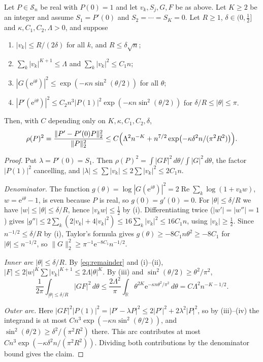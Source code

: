 \documentclass[11pt]{article}
\theoremstyle{remark}\newtheorem{remark}[theorem]{Remark}
\newcommand{\norm}[1]{\lVert #1\rVert}
\newcommand{\Rea}{\operatorname{Re}}
\newcommand{\ee}{\mathrm e}
\begin{document}
\begin{lemmaS}\label{lem:assemble}
Let \(P\in\mathcal S_n\) be real with \(P(0)=1\) and let \(v_k,S_j,G,F\)
be as above. Let \(K\ge2\) be an integer and assume
\(S_1=P'(0)\) and \(S_2=\cdots=S_K=0\). Let \(R\ge1\),
\(\delta\in(0,\frac12]\) and \(\kappa,C_1,C_2,\Lambda>0\), and suppose
\begin{enumerate}
\item[(i)] \(|v_k|\le R/(2\delta)\) for all \(k\), and \(R\le\delta\sqrt n\);
\item[(ii)] \(\sum_k|v_k|^{K+1}\le\Lambda\) and \(\sum_k|v_k|^2\le C_1n\);
\item[(iii)] \(|G(\ee^{i\theta})|^2\le\exp(-\kappa n\sin^2(\theta/2))\)
for all \(\theta\);
\item[(iv)] \(|P'(\ee^{i\theta})|^2\le C_2n^3|P(1)|^2\exp(-\kappa n\sin^2(\theta/2))\)
for \(\delta/R\le|\theta|\le\pi\).
\end{enumerate}
Then, with \(C\) depending only on \(K,\kappa,C_1,C_2,\delta\),
\[
 \rho(P)^2=\frac{\norm{P'-P'(0)P}_2^2}{\norm P_2^2}
 \le C\Bigl(\Lambda^2n^{-K}+n^{7/2}\exp\bigl(-\kappa\delta^2n/(\pi^2R^2)\bigr)\Bigr).
\]
\end{lemmaS}
\begin{proof}
Put \(\lambda=P'(0)=S_1\). Then \(\rho(P)^2=\int|GF|^2\,d\theta
/\int|G|^2\,d\theta\), the factor \(|P(1)|^2\) cancelling, and
\(|\lambda|\le\sum|v_k|\le2\sum|v_k|^2\le2C_1n\).

\emph{Denominator.} The function \(g(\theta)=\log|G(\ee^{i\theta})|^2
=2\Rea\sum_k\log(1+v_kw)\), \(w=\ee^{i\theta}-1\), is even because \(P\)
is real, so \(g(0)=g'(0)=0\). For \(|\theta|\le\delta/R\) we have
\(|w|\le|\theta|\le\delta/R\), hence \(|v_kw|\le\frac12\) by (i). Differentiating twice
(\(|w'|=|w''|=1\)) gives
\(|g''|\le2\sum_k(2|v_k|+4|v_k|^2)\le16\sum_k|v_k|^2\le16C_1n\), using
\(|v_k|\ge\frac12\). Since \(n^{-1/2}\le\delta/R\) by (i), Taylor's formula
gives \(g(\theta)\ge-8C_1n\theta^2\ge-8C_1\) for \(|\theta|\le n^{-1/2}\), so
\(\norm G_2^2\ge\pi^{-1}\ee^{-8C_1}n^{-1/2}\).

\emph{Inner arc \(|\theta|\le\delta/R\).} By \eqref{eq:remainder} and
(i)--(ii), \(|F|\le2|w|^K\sum|v_k|^{K+1}\le2\Lambda|\theta|^K\). By (iii)
and \(\sin^2(\theta/2)\ge\theta^2/\pi^2\),
\[
 \frac1{2\pi}\int_{|\theta|\le\delta/R}|GF|^2\,d\theta
 \le\frac{2\Lambda^2}\pi\int_{\mathbb R}\theta^{2K}
 \ee^{-\kappa n\theta^2/\pi^2}\,d\theta
 =C\Lambda^2n^{-K-1/2}.
\]

\emph{Outer arc.} Here \(|GF|^2|P(1)|^2=|P'-\lambda P|^2\le
2|P'|^2+2\lambda^2|P|^2\), so by (iii)--(iv) the integrand is at most
\(Cn^3\exp(-\kappa n\sin^2(\theta/2))\), and
\(\sin^2(\theta/2)\ge\delta^2/(\pi^2R^2)\) there. This arc contributes at most
\(Cn^3\exp(-\kappa\delta^2n/(\pi^2R^2))\). Dividing both contributions by
the denominator bound gives the claim.
\end{proof}
\end{document}
